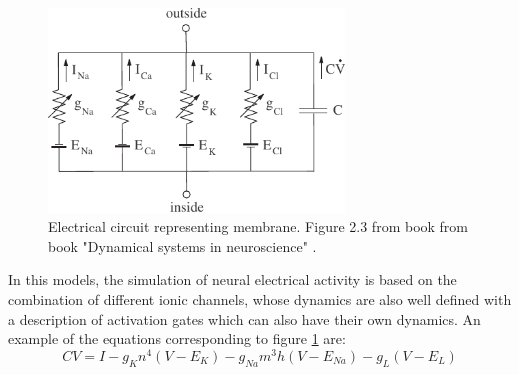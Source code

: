 \begin{figure}[htb!]
	\centering
	\includegraphics[width=0.7\textwidth]{./img/intro/dns_neuron_circuit.pdf}
	\caption{Electrical circuit representing membrane. Figure 2.3 from book from book "Dynamical systems in neuroscience" \cite{izhikevich_dynamical_2007}.}
	\label{fig:electrical circuit}
\end{figure}

In this models, the simulation of neural electrical activity is based on the combination of different ionic channels, whose dynamics are also well defined with a description of activation gates which can also have their own dynamics. An example of the equations corresponding to figure \ref{fig:electrical circuit} are:
\begin{equation}
		C V = I - g_K n^4 (V - E_K) - g_{Na} m^3h(V-E_{Na}) - g_L (V-E_L)
\end{equation}

